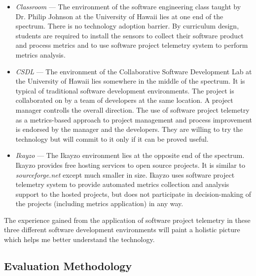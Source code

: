 \begin{itemize}
	\item \textit{Classroom} --- The environment of the software engineering class taught by Dr. Philip Johnson at the University of Hawaii lies at one end of the spectrum. There is no technology adoption barrier. By curriculum design, students are required to install the sensors to collect their software product and process metrics and to use software project telemetry system to perform metrics analysis.
	
	\item \textit{CSDL} --- The environment of the Collaborative Software Development Lab at the University of Hawaii lies somewhere in the middle of the spectrum. It is typical of traditional software development environments. The project is collaborated on by a team of developers at the same location. A project manager controlls the overall direction. The use of software project telemetry as a metrics-based approach to project management and process improvement is endorsed by the manager and the developers. They are willing to try the technology but will commit to it only if it can be proved useful.
	
	\item \textit{Ikayzo} --- The Ikayzo environment lies at the opposite end of the spectrum. Ikayzo provides free hosting services to open source projects. It is similar to \textit{sourceforge.net} except much smaller in size. Ikayzo uses software project telemetry system to provide automated metrics collection and analysis support to the hosted projects, but does not participate in decision-making of the projects (including metrics application) in any way.
	
\end{itemize}

The experience gained from the application of software project telemetry in these three different software development environments will paint a holistic picture which helps me better understand the technology.



\subsection{Evaluation Methodology} \label{EvaluationStrategy:Strategy:Methodology}


